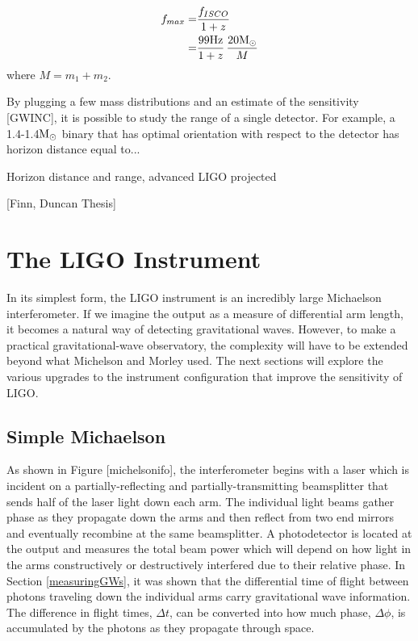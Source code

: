 	\begin{equation}
	\begin{aligned}
	f_{max}	=&  \frac{f_{ISCO}}{1+z} \\
			=&	\frac{99 \text{Hz}}{1+z} \, \frac{20 \textup{M}_\odot}{M}
	\end{aligned}
	\end{equation}
	where $M=m_1+m_2$.
	
	
	By plugging a few mass distributions and an estimate of the sensitivity [GWINC], it is possible to study the range of a single detector.  For example, a 1.4-1.4$\textup{M}_\odot$ binary that has optimal orientation with respect to the detector has horizon distance equal to...
	
	Horizon distance and range, advanced LIGO projected
	
	[Finn, Duncan Thesis]
	\cite{Saulson}
	
	\section{The LIGO Instrument}\label{LIGOInstrument}
	In its simplest form, the LIGO instrument is an incredibly large Michaelson interferometer.  
	If we imagine the output as a measure of differential arm length, it becomes a natural way of detecting gravitational waves. 
	However, to make a practical gravitational-wave observatory, the complexity will have to be extended beyond what Michelson and Morley used.  
	The next sections will explore the various upgrades to the instrument configuration that improve the sensitivity of LIGO.
	
		\subsection{Simple Michaelson}\label{michelson}
		As shown in Figure [michelsonifo], the interferometer begins with a laser which is incident on a partially-reflecting and partially-transmitting beamsplitter that sends half of the laser light down each arm.  The individual light beams gather phase as they propagate down the arms and then reflect from two end mirrors and eventually recombine at the same beamsplitter.  A photodetector is located at the output and measures the total beam power which will depend on how light in the arms constructively or destructively interfered due to their relative phase.
		In Section \ref{measuringGWs}, it was shown that the differential time of flight between photons traveling down the individual arms carry gravitational wave information.  
		The difference in flight times, $\Delta t$, can be converted into how much phase, $\Delta \phi$, is accumulated by the photons as they propagate through space.  
		
